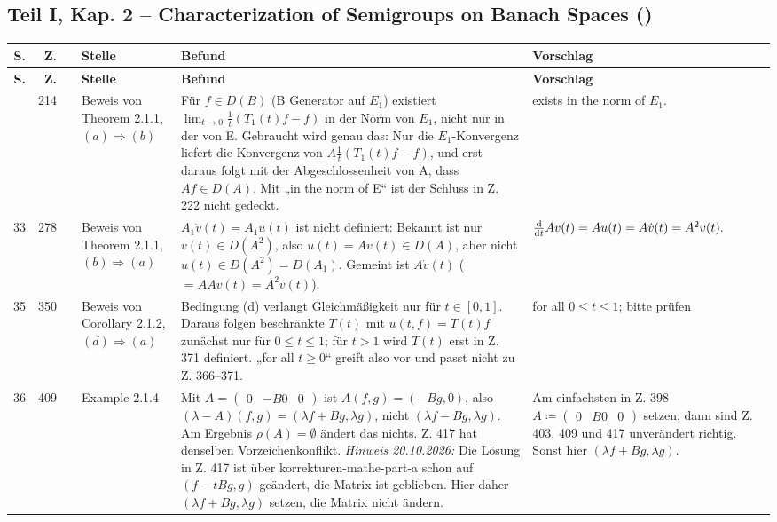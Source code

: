 \documentclass[10pt]{article}
\begin{document}
\subsection*{Teil I, Kap. 2 – Characterization of Semigroups on Banach Spaces ()}
\begin{longtable}{@{}rrc>{\RaggedRight\arraybackslash}p{3.0cm}>{\RaggedRight\arraybackslash}p{11.4cm}>{\RaggedRight\arraybackslash}p{7.4cm}@{}}
\toprule
\textbf{S.} & \textbf{Z.} & \textbf{} & \textbf{Stelle} & \textbf{Befund} & \textbf{Vorschlag} \\
\midrule
\endfirsthead
\toprule
\textbf{S.} & \textbf{Z.} & \textbf{} & \textbf{Stelle} & \textbf{Befund} & \textbf{Vorschlag} \\
\midrule
\endhead
\bottomrule
\endlastfoot
33 & 214 & \sichA{} & Beweis von Theorem 2.1.1, $(a)\ensuremath{\Rightarrow}(b)$ & Für $f \in D(B)$ (B Generator auf $E_1$) existiert $\lim_{t\to 0}\frac{1}{t}(T_{1}(t)f-f)$ in der Norm von $E_{1}$, nicht nur in der von E. Gebraucht wird genau das: Nur die $E_1$-Konvergenz liefert die Konvergenz von $A\frac{1}{t}(T_{1}(t)f-f)$, und erst daraus folgt mit der Abgeschlossenheit von A, dass $Af \in D(A)$. Mit „in the norm of E“ ist der Schluss in Z. 222 nicht gedeckt. & {exists in the norm of\/ $E_{1}$.} \\[2pt]
33 & 278 & \sichB{} & Beweis von Theorem 2.1.1, $(b)\ensuremath{\Rightarrow}(a)$ & $A_{1}\dot{v}(t) = A_{1}u(t)$ ist nicht definiert: Bekannt ist nur $v(t) \in D(A^{2})$, also $u(t) = Av(t) \in D(A)$, aber nicht $u(t) \in D(A^{2}) = D(A_{1})$. Gemeint ist $A\dot{v}(t)$ ($= AAv(t) = A^{2}v(t)$). & $\frac{\mathop{}\!\mathrm{d}{}}{\mathop{}\!\mathrm{d}{t}}Av(t) = Au(t) = A\dot{v}(t) = A^{2}v(t).$ \\[2pt]
35 & 350 & \sichC{} & Beweis von Corollary 2.1.2, $(d)\ensuremath{\Rightarrow}(a)$ & Bedingung (d) verlangt Gleichmäßigkeit nur für $t \in [0,1]$. Daraus folgen beschränkte $T(t)$ mit $u(t,f) = T(t)f$ zunächst nur für $0 \leq t \leq 1$; für $t > 1$ wird $T(t)$ erst in Z. 371 definiert. „for all $t \ensuremath{\geq} 0$“ greift also vor und passt nicht zu Z. 366–371. & {for all $0 \leq t \leq 1$}; bitte prüfen \\[2pt]
36 & 409 & \sichA{} & Example 2.1.4 & Mit $A = \begin{pmatrix} 0 & -B   0 & 0 \end{pmatrix}$ ist $A(f,g) = (-Bg,0)$, also $(\lambda-A)(f,g) = (\lambda f + Bg,\lambda g)$, nicht $(\lambda f - Bg,\lambda g)$. Am Ergebnis $\rho(A) = \emptyset$ ändert das nichts. Z. 417 hat denselben Vorzeichenkonflikt. \emph{Hinweis 20.10.2026:} Die Lösung in Z. 417 ist über {korrekturen-mathe-part-a} schon auf $(f - tBg, g)$ geändert, die Matrix ist geblieben. Hier daher $(\lambda f + Bg,\lambda g)$ setzen, die Matrix nicht ändern. & Am einfachsten in Z. 398 $A \coloneq \begin{pmatrix} 0 & B   0 & 0 \end{pmatrix}$ setzen; dann sind Z. 403, 409 und 417 unverändert richtig. Sonst hier $(\lambda f + Bg,\lambda g)$. \\[2pt]

\end{longtable}
\end{document}
